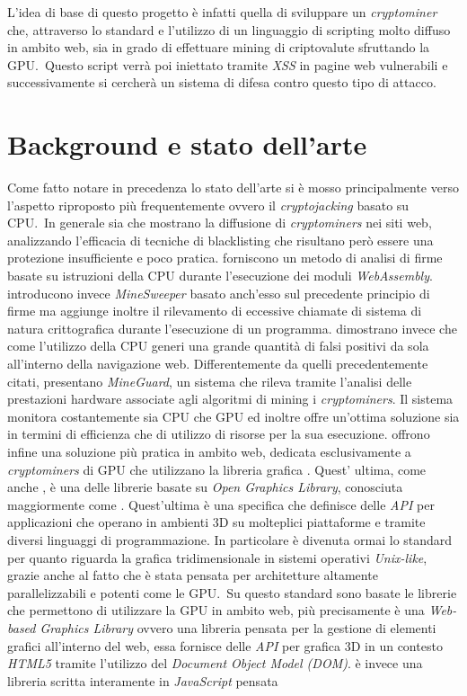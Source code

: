 \documentclass[
11pt, %
oneside, %
italian, %
onehalfspacing,%
headsepline, %
]{MastersDoctoralThesis} %
\newcommand\citen[1]{\citeauthor{#1} \citep{#1}}
\newcommand\citetitlen[1]{\citetitle{#1} \citep{#1}}
\begin{document}
L'idea di base di questo progetto è infatti quella di sviluppare un \emph{cryptominer} che, attraverso lo standard \citetitlen{OpenGL} e l'utilizzo di un linguaggio di scripting molto diffuso in ambito web, sia in grado di effettuare mining di criptovalute sfruttando la GPU.\ Questo script verrà poi iniettato tramite \emph{XSS} in pagine web vulnerabili e successivamente si cercherà un sistema di difesa contro questo tipo di attacco.

{\chapter{Background e stato dell'arte}}
Come fatto notare in precedenza lo stato dell'arte si è mosso principalmente verso l'aspetto riproposto più frequentemente ovvero il \emph{cryptojacking} basato su CPU.\ In generale sia \citen{musch2018web} che \citen{saad2018end} mostrano la diffusione di \emph{cryptominers} nei siti web, analizzando l'efficacia di tecniche di blacklisting che risultano però essere una protezione insufficiente e poco pratica. \citen{wang2018seismic} forniscono un metodo di analisi di firme basate su istruzioni della CPU durante l'esecuzione dei moduli \emph{WebAssembly}. \citen{konoth2018minesweeper} introducono invece \emph{MineSweeper} basato anch'esso sul precedente principio di firme ma aggiunge inoltre il rilevamento di eccessive chiamate di sistema di natura crittografica durante l'esecuzione di un programma. \citen{kharraz2019outguard} dimostrano invece che come l'utilizzo della CPU generi una grande quantità di falsi positivi da sola all'interno della navigazione web. Differentemente da quelli precedentemente citati, \citen{tahir2017mining} presentano \emph{MineGuard}, un sistema che rileva tramite l'analisi delle prestazioni hardware associate agli algoritmi di mining i \emph{cryptominers}. Il sistema monitora costantemente sia CPU che GPU ed inoltre offre un'ottima soluzione sia in termini di efficienza che di utilizzo di risorse per la sua esecuzione. \citen{belkin2019risks} offrono infine una soluzione più pratica in ambito web, dedicata esclusivamente a \emph{cryptominers} di GPU che utilizzano la libreria grafica \citetitlen{WebGL}. Quest' ultima, come anche \citetitlen{GPU.js}, è una delle librerie basate su \emph{Open Graphics Library}, conosciuta maggiormente come . Quest'ultima è una specifica che definisce delle \emph{API} per applicazioni che operano in ambienti 3D su molteplici piattaforme e tramite diversi linguaggi di programmazione. In particolare è divenuta ormai lo standard per quanto riguarda la grafica tridimensionale in sistemi operativi \emph{Unix-like}, grazie anche al fatto che è stata pensata per architetture altamente parallelizzabili e potenti come le GPU.\ Su questo standard sono basate le librerie che permettono di utilizzare la GPU in ambito web, più precisamente  è una \emph{Web-based Graphics Library} ovvero una libreria pensata per la gestione di elementi grafici all'interno del web, essa fornisce delle \emph{API} per grafica 3D in un contesto \emph{HTML5} tramite l'utilizzo del \emph{Document Object Model (DOM)}.  è invece una libreria scritta interamente in \emph{JavaScript} pensata 
\end{document}
